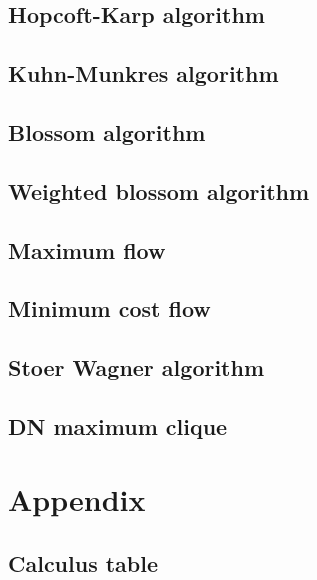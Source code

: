 \documentclass[titlepage, a4paper,10pt]{article}
\begin{document}
\begin{multicols}{2}
\begin{spacing}{0.6}
			\subsection{Hopcoft-Karp algorithm}
				
			\subsection{Kuhn-Munkres algorithm}
				
			\subsection{Blossom algorithm}
				
			\subsection{Weighted blossom algorithm}
				
			\subsection{Maximum flow}
				
			\subsection{Minimum cost flow}
				
			\subsection{Stoer Wagner algorithm}
				
			\subsection{DN maximum clique}
				
		\section{Appendix}
			\subsection{Calculus table}
				
				
		\end{spacing}
		\endgroup
	\end{multicols}
\end{document}
